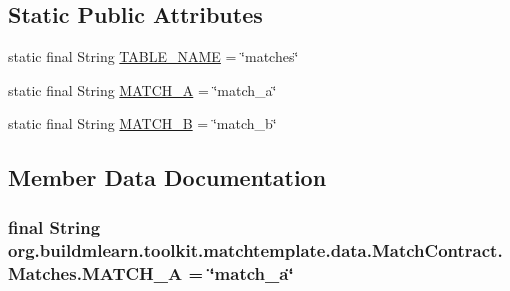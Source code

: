 \subsection*{Static Public Attributes}
\begin{DoxyCompactItemize}
\item 
static final String \hyperlink{classorg_1_1buildmlearn_1_1toolkit_1_1matchtemplate_1_1data_1_1MatchContract_1_1Matches_a3447c3266480981f7f6521c2dba8d3f3}{T\+A\+B\+L\+E\+\_\+\+N\+A\+ME} = \char`\"{}matches\char`\"{}
\item 
static final String \hyperlink{classorg_1_1buildmlearn_1_1toolkit_1_1matchtemplate_1_1data_1_1MatchContract_1_1Matches_a659ba175ced89378af87d487fb32e4f3}{M\+A\+T\+C\+H\+\_\+A} = \char`\"{}match\+\_\+a\char`\"{}
\item 
static final String \hyperlink{classorg_1_1buildmlearn_1_1toolkit_1_1matchtemplate_1_1data_1_1MatchContract_1_1Matches_ad909622a9825441c52671642d23600a7}{M\+A\+T\+C\+H\+\_\+B} = \char`\"{}match\+\_\+b\char`\"{}
\end{DoxyCompactItemize}


\subsection{Member Data Documentation}
\subsubsection[{\texorpdfstring{M\+A\+T\+C\+H\+\_\+A}{MATCH_A}}]{\setlength{\rightskip}{0pt plus 5cm}final String org.\+buildmlearn.\+toolkit.\+matchtemplate.\+data.\+Match\+Contract.\+Matches.\+M\+A\+T\+C\+H\+\_\+A = \char`\"{}match\+\_\+a\char`\"{}\hspace{0.3cm}{\ttfamily [static]}}\hypertarget{classorg_1_1buildmlearn_1_1toolkit_1_1matchtemplate_1_1data_1_1MatchContract_1_1Matches_a659ba175ced89378af87d487fb32e4f3}{}\label{classorg_1_1buildmlearn_1_1toolkit_1_1matchtemplate_1_1data_1_1MatchContract_1_1Matches_a659ba175ced89378af87d487fb32e4f3}
